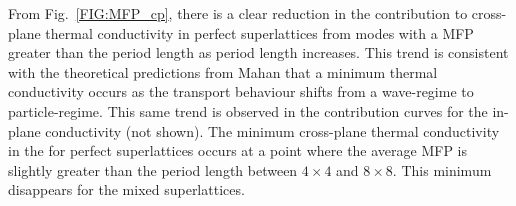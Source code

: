 \documentclass[aps,prb,preprint,preprintnumbers,amsmath,amssymb,floatfix,superscriptaddress]{revtex4}
\begin{document}
\begin{comment}
\begin{table}
\begin{center}
\begin{tabular}{lcc}
\hline\hline\noalign{\smallskip}
&\multicolumn{2}{c}{Method} \\
\cline{2-3}\noalign{\smallskip}
$k$ & NMD  & GK  \\
\noalign{\smallskip}\hline\noalign{\smallskip}
Cross-Plane Perfect  & 0.24 $\pm$ 0.02 & 0.22 $\pm$ 0.04\\
Cross-Plane 80/20    & 0.17  $\pm$ 0.01   &   0.18 $\pm$ 0.02 \\
Cross-Plane 60/40    & 0.18  $\pm$ 0.01   &   0.19 $\pm$ 0.02 \\
In-Plane Perfect   & 0.52 $\pm$ 0.03 & 0.54 $\pm$ 0.03  \\
In-Plane 80/20  & 0.25 $\pm$ 0.02 & 0.30 $\pm$ 0.01  \\
In-Plane 60/40   & 0.20 $\pm$ 0.02 & 0.26 $\pm$ 0.01  \\
\noalign{\smallskip}\hline\hline
\end{tabular}
\end{center}
\renewcommand{\table}{Table.}
\caption{A comparison of the thermal conductivity predictions [$Wm^{-1}K^{-1}$] predictions for a $4\times4$ superlattice.}
\label{TB:validate}
\end{table}
\end{comment}

From Fig.~\ref{FIG:MFP_cp}, there is a clear reduction in the contribution to cross-plane thermal conductivity in perfect superlattices from modes with a MFP greater than the period length as period length increases. This trend is consistent with the theoretical predictions from Mahan that a minimum thermal conductivity occurs as the transport behaviour shifts from a wave-regime to particle-regime.\cite{PhysRevLett.84.927,PhysRevB.56.10754} This same trend is observed in the contribution curves for the in-plane conductivity (not shown). The minimum cross-plane thermal conductivity in the for perfect superlattices occurs at a point where the average MFP is slightly greater than the period length between $4 \times 4$ and $8 \times 8$. This minimum disappears for the mixed superlattices.
\end{document}
